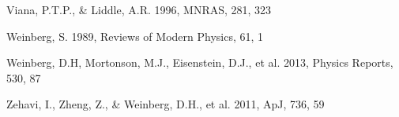\documentclass[iop]{emulateapj}
\begin{document}
\begin{thebibliography}{}



Viana, P.T.P., \& Liddle, A.R. 1996, MNRAS, 281, 323



Weinberg, S. 1989, Reviews of Modern Physics, 61, 1

Weinberg, D.H, Mortonson, M.J., Eisenstein, D.J., et al. 2013, Physics Reports, 530, 87




Zehavi, I., Zheng, Z., \& Weinberg, D.H., et al. 2011, ApJ, 736, 59




\end{thebibliography}
\end{document}
